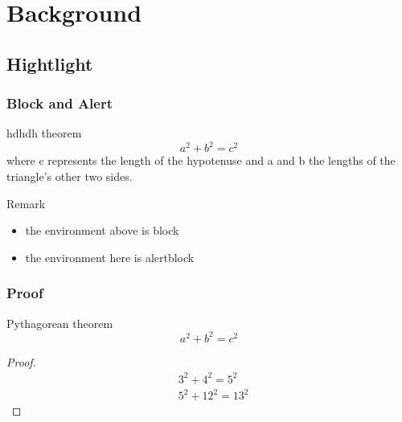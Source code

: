 \section{Background}
\subsection{Hightlight}

\begin{frame}
    \frametitle{Block and Alert}

    \begin{block}{hdhdh theorem}
        \vspace*{-\baselineskip}\setlength\belowdisplayshortskip{0.6pt}
        $$a^2 + b^2 = c^2$$
        where c represents the length of the hypotenuse and 
        a and b the lengths of the triangle's other two sides.
    \end{block}
    
    \begin{alertblock}{Remark}
        \begin{itemize}
            \item the environment above is \alert{block}
            \item the environment here is \alert{alertblock}
        \end{itemize}
    \end{alertblock}

\end{frame}

\begin{frame}
    \frametitle{Proof}

    \begin{block}{Pythagorean theorem}
        \vspace*{-\baselineskip}\setlength\belowdisplayshortskip{0.1pt}
        $$a^2 + b^2 = c^2$$
    \end{block}
    
    \vspace{0.4cm}

    \begin{proof}
        \vspace*{-\baselineskip}\setlength\belowdisplayshortskip{0pt}
        \begin{align*}
            &3^2 + 4^2 = 5^2\\
            &5^2 + 12^2 = 13^2
        \end{align*}
    \end{proof}
\end{frame}

